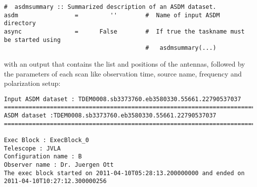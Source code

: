 \small

\begin{verbatim}
#  asdmsummary :: Summarized description of an ASDM dataset.
asdm                =         ''        #  Name of input ASDM directory
async               =      False        #  If true the taskname must be started using
                                        #   asdmsummary(...)
\end{verbatim}
\normalsize

with an output that contains the list and positions of the
antennas, followed by the parameters of each scan like observation
time, source name, frequency and polarization setup: 

\small
\begin{verbatim}
Input ASDM dataset : TDEM0008.sb3373760.eb3580330.55661.22790537037
========================================================================================
ASDM dataset :TDEM0008.sb3373760.eb3580330.55661.22790537037
========================================================================================

Exec Block : ExecBlock_0
Telescope : JVLA
Configuration name : B
Observer name : Dr. Juergen Ott
The exec block started on 2011-04-10T05:28:13.200000000 and ended on 2011-04-10T10:27:12.300000256


\end{verbatim}
